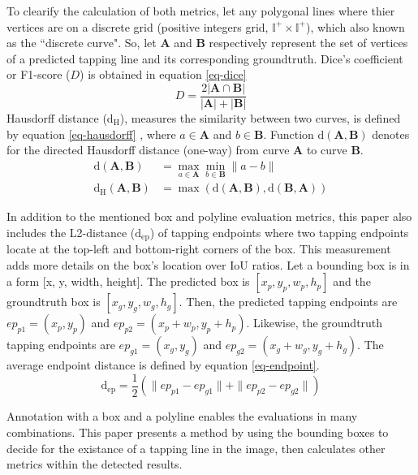 \documentclass[default,pdflatex,iicol]{sn-jnl}%
\begin{document}
To clearify the calculation of both metrics, let any polygonal lines where thier vertices are on a discrete grid (positive integers grid, $\mathbb{I^+}\times \mathbb{I^+}$), which also known as the ``discrete curve". So, let $\textbf{A}$ and $\textbf{B}$ respectively represent the set of vertices of a predicted tapping line and its corresponding groundtruth. Dice's coefficient or F1-score ($D$) is obtained in equation \ref{eq-dice}
\begin{equation}
D = \frac{2 \lvert \textbf{A} \cap \textbf{B} \rvert }{\lvert\textbf{A}\rvert+\lvert\textbf{B}\rvert}\label{eq-dice}
\end{equation}
Hausdorff distance ($\mathrm{d_H}$), measures the similarity between two curves, is defined by equation \ref{eq-hausdorff} \cite{Huttenlocher1993ComparingIU}, where $a \in \textbf{A}$ and $b \in \textbf{B}$. Function $\mathrm{d}(\textbf{A},\textbf{B})$ denotes for the directed Hausdorff distance (one-way) from curve \textbf{A} to curve \textbf{B}.
\begin{align}
\mathrm{d}(\textbf{A},\textbf{B}) &= \max_{a\in\textbf{A}} \min_{b\in\textbf{B}} \| a-b \|  \nonumber \\
\mathrm{d_H}(\textbf{A},\textbf{B}) &= \max (\mathrm{d}(\textbf{A},\textbf{B}), \mathrm{d}(\textbf{B},\textbf{A})) \label{eq-hausdorff}
\end{align}

In addition to the mentioned box and polyline evaluation metrics, this paper also includes the L2-distance ($\mathrm{d_{ep}}$) of tapping endpoints where two tapping endpoints locate at the top-left and bottom-right corners of the box. This measurement adds more details on the box's location over IoU ratios. Let a bounding box is in a form [x, y, width, height]. The predicted box is $[x_p, y_p, w_p, h_p]$ and the groundtruth box is $[x_g, y_g, w_g, h_g]$. Then, the predicted tapping endpoints are $ep_{p1} = (x_p, y_p)$ and $ep_{p2} = (x_p+w_p, y_p+h_p)$. Likewise, the groundtruth tapping endpoints are $ep_{g1} = (x_g, y_g)$ and $ep_{g2} = (x_g+w_g, y_g+h_g)$. The average endpoint distance is defined by equation \ref{eq-endpoint}.
\begin{equation}
\mathrm{d_{ep}} = \frac{1}{2} (\| ep_{p1}- ep_{g1} \| + \| ep_{p2}  - ep_{g2} \|) \label{eq-endpoint}
\end{equation}

Annotation with a box and a polyline enables the evaluations in many combinations. This paper presents a method by using the bounding boxes to decide for the existance of a tapping line in the image, then calculates other metrics within the detected results.
\end{document}
